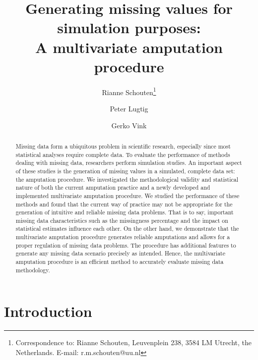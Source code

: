 \documentclass[11pt,a4paper]{article}
\begin{document}
\title{\LARGE\bf Generating missing values for simulation purposes:\\ A multivariate amputation procedure}

\author[1,2]{Rianne Schouten\thanks{Correspondence to: Rianne Schouten, Leuvenplein 238, 3584 LM Utrecht, the Netherlands. E-mail: r.m.schouten@uu.nl}}
\author[1]{Peter Lugtig}
\author[1]{Gerko Vink}

\date{}
\maketitle

\begin{abstract}

Missing data form a ubiquitous problem in scientific research, especially since most statistical analyses require complete data. To evaluate the performance of methods dealing with missing data, researchers perform simulation studies. An important aspect of these studies is the generation of missing values in a simulated, complete data set: the amputation procedure. We investigated the methodological validity and statistical nature of both the current amputation practice and a newly developed and implemented multivariate amputation procedure. We studied the performance of these methods and found that the current way of practice may not be appropriate for the generation of intuitive and reliable missing data problems. That is to say, important missing data characteristics such as the missingness percentage and the impact on statistical estimates influence each other. On the other hand, we demonstrate that the multivariate amputation procedure generates reliable amputations and allows for a proper regulation of missing data problems. The procedure has additional features to generate any missing data scenario precisely as intended. Hence, the multivariate amputation procedure is an efficient method to accurately evaluate missing data methodology.

\end{abstract}

\section{Introduction}
\end{document}
